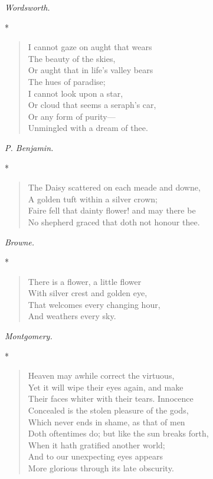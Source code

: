 \documentclass[11pt,twoside]{article}
\newcommand\stars{\begin{center}*\quad*\quad*\end{center}}
\newcommand\by[1]{\par\hfill\textit{#1}\par}
\begin{document}
\by{Wordsworth.}

\stars

\begin{verse}
I cannot gaze on aught that wears\\
\quad The beauty of the skies,\\
Or aught that in life’s valley bears\\
\quad The hues of paradise;\\
I cannot look upon a star,\\
Or cloud that seems a seraph’s car,\\
Or any form of purity---\\
Unmingled with a dream of thee.
\end{verse}

\by{P. Benjamin.}

\stars

\begin{verse}
The Daisy scattered on each meade and downe,\\
A golden tuft within a silver crown;\\
Faire fell that dainty flower! and may there be\\
No shepherd graced that doth not honour thee.
\end{verse}

\by{Browne.}

\stars

\begin{verse}
There is a flower, a little flower\\
\quad With silver crest and golden eye,\\
That welcomes every changing hour,\\
\quad And weathers every sky.
\end{verse}

\by{Montgomery.}

\stars

\begin{verse}
Heaven may awhile correct the virtuous,\\
Yet it will wipe their eyes again, and make\\
Their faces whiter with their tears. Innocence\\
Concealed is the stolen pleasure of the gods,\\
Which never ends in shame, as that of men\\
Doth oftentimes do; but like the sun breaks forth,\\
When it hath gratified another world;\\
And to our unexpecting eyes appears\\
More glorious through its late obscurity.
\end{verse}
\end{document}
